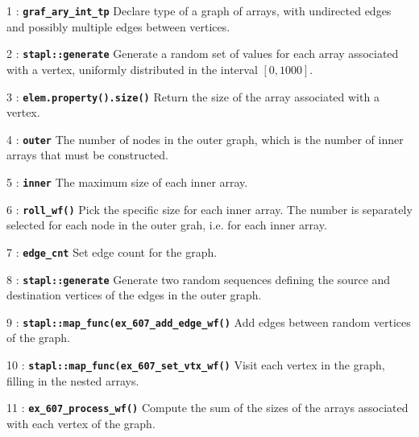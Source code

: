 \documentclass{report}
\begin{document}
\begin{hashitemize}
\item 1 : \texttt{{\bf graf\_ary\_int\_tp}}
\newline
Declare type of a graph of arrays, with undirected edges and possibly multiple
edges between vertices.

\item 2 : \texttt{{\bf stapl::generate}}
\newline
Generate a random set of values for each array associated with a vertex,
uniformly distributed in the interval $[0, 1000]$.

\item 3 : \texttt{{\bf elem.property().size()}}
\newline
Return the size of the array associated with a vertex.

\item 4 : \texttt{{\bf outer}}
\newline
The number of nodes in the outer graph, which is the number of inner arrays that
must be constructed.

\item 5 : \texttt{{\bf inner}}
\newline
The maximum size of each inner array.

\item 6 : \texttt{{\bf roll\_wf()}}
\newline
Pick the specific size for each inner array.  The number is
separately selected for each node in the outer grah, i.e. for each inner array.

\item 7 : \texttt{{\bf edge\_cnt}}
\newline
Set edge count for the graph.

\item 8 : \texttt{{\bf stapl::generate}}
\newline
Generate two random sequences defining the source and destination vertices of
the edges in the outer graph. 

\item 9 : \texttt{{\bf stapl::map\_func(ex\_607\_add\_edge\_wf()}}
\newline
Add edges between random vertices of the graph.

\item 10 : \texttt{{\bf stapl::map\_func(ex\_607\_set\_vtx\_wf()}}
\newline
Visit each vertex in the graph, filling in the nested arrays.

\item 11 : \texttt{{\bf ex\_607\_process\_wf()}}
\newline
Compute the sum of the sizes of the arrays associated with each vertex
of the graph.

\end{hashitemize}
\end{document}
